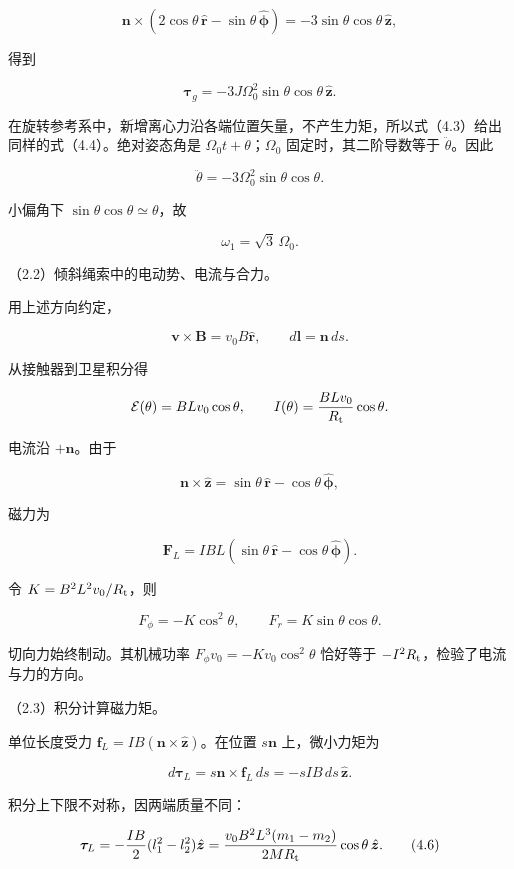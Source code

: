 \documentclass[12pt,a4paper,fontset=fandol]{ctexart}
\begin{document}
\[
\boldsymbol n\times(2\cos\theta\,\hat{\boldsymbol r}
-\sin\theta\,\hat{\boldsymbol\phi})
=-3\sin\theta\cos\theta\,\hat{\boldsymbol z},
\]

得到

\[
\boldsymbol\tau_g=-3J\Omega_0^2\sin\theta\cos\theta\,\hat{\boldsymbol z}.
\tag{4.4}
\]

在旋转参考系中，新增离心力沿各端位置矢量，不产生力矩，所以式（4.3）给出同样的式（4.4）。绝对姿态角是
\(\Omega_0t+\theta\)；\(\Omega_0\) 固定时，其二阶导数等于
\(\ddot\theta\)。因此

\[
\ddot\theta=-3\Omega_0^2\sin\theta\cos\theta.
\]

小偏角下 \(\sin\theta\cos\theta\simeq\theta\)，故

\[
\boxed{\omega_1=\sqrt3\,\Omega_0.}
\]

（2.2）倾斜绳索中的电动势、电流与合力。

用上述方向约定，

\[
\boldsymbol v\times\boldsymbol B=v_0B\hat{\boldsymbol r},
\qquad
d\boldsymbol l=\boldsymbol n\,ds.
\]

从接触器到卫星积分得

\[
\mathcal E(\theta)=BLv_0\cos\theta,\qquad
I(\theta)=\frac{BLv_0}{R_{\rm t}}\cos\theta.
\]

电流沿 \(+\boldsymbol n\)。由于

\[
\boldsymbol n\times\hat{\boldsymbol z}
=\sin\theta\,\hat{\boldsymbol r}-\cos\theta\,\hat{\boldsymbol\phi},
\]

磁力为

\[
\boldsymbol F_L=IBL
(\sin\theta\,\hat{\boldsymbol r}-\cos\theta\,\hat{\boldsymbol\phi}).
\]

令 \(K=B^2L^2v_0/R_{\rm t}\)，则

\[
\boxed{F_\phi=-K\cos^2\theta,\qquad
F_r=K\sin\theta\cos\theta.}
\tag{4.5}
\]

切向力始终制动。其机械功率 \(F_\phi v_0=-K v_0\cos^2\theta\) 恰好等于
\(-I^2R_{\rm t}\)，检验了电流与力的方向。

（2.3）积分计算磁力矩。

单位长度受力
\(\boldsymbol f_L=IB(\boldsymbol n\times\hat{\boldsymbol z})\)。在位置
\(s\boldsymbol n\) 上，微小力矩为

\[
d\boldsymbol\tau_L=s\boldsymbol n\times\boldsymbol f_L\,ds
=-sIB\,ds\,\hat{\boldsymbol z}.
\]

积分上下限不对称，因两端质量不同：

\[
\boldsymbol\tau_L
=-\frac{IB}{2}(l_1^2-l_2^2)\hat{\boldsymbol z}
=\frac{v_0B^2L^3(m_1-m_2)}{2MR_{\rm t}}
\cos\theta\,\hat{\boldsymbol z}.
\tag{4.6}
\]
\end{document}
